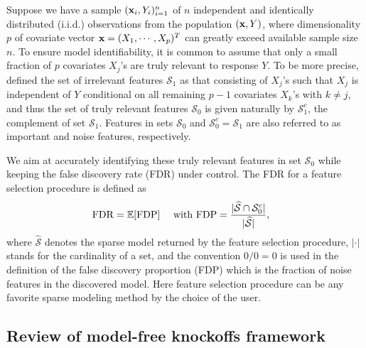 \documentclass[11pt]{article}
\newcommand{\bx}{\mbox{\bf x}}
\def\t{^T}
\begin{document}

Suppose we have a sample $(\bx_i, Y_i)_{i = 1}^n$ of $n$ independent and identically distributed (i.i.d.) observations from the population $(\bx, Y)$, where dimensionality $p$ of covariate vector $\bx = (X_1, \cdots, X_p)\t$ can greatly exceed available sample size $n$. To ensure model identifiability, it is common to assume that only a small fraction of $p$ covariates $X_j$'s are truly relevant to response $Y$. To be more precise, \cite{CandesFanJansonLv2016} defined the set of irrelevant features $\mathcal{S}_1$ as that consisting of $X_j$'s such that $X_j$ is independent of $Y$ conditional on all remaining $p - 1$ covariates $X_k$'s with $k \neq j$, and thus the set of truly relevant features $\mathcal{S}_0$ is given naturally by $\mathcal{S}_1^c$, the complement of set $\mathcal{S}_1$. Features in sets $\mathcal{S}_0$ and $\mathcal{S}_0^c = \mathcal{S}_1$ are also referred to as important and noise features, respectively.

We aim at accurately identifying these truly relevant features in set $\mathcal{S}_0$ while keeping the false discovery rate (FDR) \cite{BenjaminiHochberg1995} under control. The FDR for a feature selection procedure is defined as
\begin{align}\label{eq-fdr}
& {\rm FDR}=\mathbb{E}[{\rm FDP}] \quad \text{ with } {\rm FDP}=\dfrac{|\widehat{\mathcal{S}} \cap \mathcal{S}_0^c |}{|\widehat{\mathcal{S}}|},
\end{align}
where $\widehat{\mathcal{S}}$ denotes the sparse model returned by the feature selection procedure, $|\cdot|$ stands for the cardinality of a set, and the convention $0/0 = 0$ is used in the definition of the false discovery proportion (FDP) which is the fraction of noise features in the discovered model. Here feature selection procedure can be any favorite sparse modeling method by the choice of the user.

\subsection{Review of model-free knockoffs framework} \label{subsec2.1}
\end{document}
